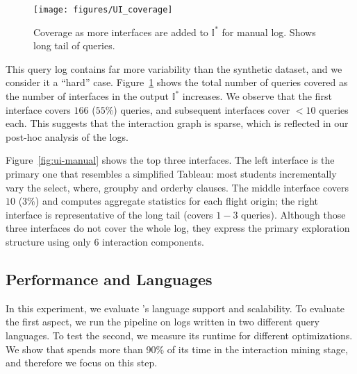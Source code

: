 \begin{figure}[h!]
    \centering
    \texttt{[image: figures/UI\_coverage]}
  \caption{Coverage as more interfaces are added to $\mathbb{I}^*$ for manual log. Shows long tail of queries.}
    \label{fig:ui-manual-coverage}
\end{figure}
This query log contains far more variability than the synthetic dataset, and we consider it a ``hard'' case. Figure~\ref{fig:ui-manual-coverage} shows the total number of queries covered as the number of interfaces in the output $\mathbb{I}^*$ increases. We observe that the first interface covers $166$ ($55\%$) queries, and subsequent interfaces cover $<10$ queries each. This suggests that the interaction graph is sparse, which is reflected in our post-hoc analysis of the logs. %


Figure~\ref{fig:ui-manual} shows the top three interfaces. The left interface is the primary one that resembles a simplified Tableau: most students incrementally vary the select, where, groupby and orderby clauses.  The middle interface covers $10$ ($3\%$) and computes aggregate statistics for each flight origin; the right interface is representative of the long tail (covers $1-3$ queries). Although those three interfaces do not cover the whole log, they express the primary exploration structure using only 6 interaction components. %







\subsection{Performance and Languages}
\label{sec:atscale}

In this experiment, we evaluate \sys{}'s language support and scalability. To evaluate the first aspect, we run the pipeline on logs written in two different query languages. To
test the second, we measure its runtime for different optimizations. We show that \sys{} spends more than 90\% of its time in the interaction mining stage, and therefore we focus on this step.

